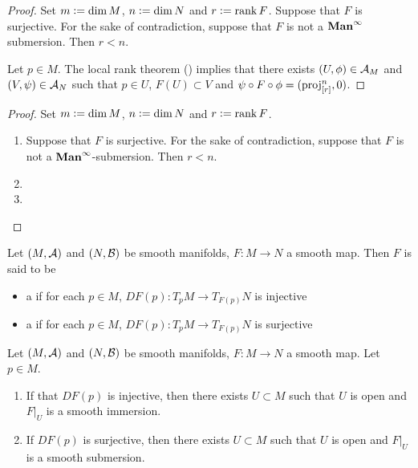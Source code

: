 \documentclass{book}
\begin{document}
	\begin{proof}
		Set $m \vcentcolon= \dim M$, $n \vcentcolon= \dim N$ and $r \vcentcolon= \operatorname{\text{rank}} F$. Suppose that $F$ is surjective. For the sake of contradiction, suppose that $F$ is not a $\operatorname*{\text{\textbf{Man}}^{\infty}}$ submersion. Then $r < n$. 
		
		
		Let $p \in M$. The local rank theorem () implies that there exists $(U, \phi) \in \mathcal{A}_M$ and $(V, \psi) \in \mathcal{A}_N$ such that $p \in U$, $F(U) \subset V$ and $\psi \circ F \circ \phi = (\operatorname{\text{proj}}^n_{[r]}, 0)$. 
		
		
	\end{proof}

	\begin{proof}
		Set $m \vcentcolon= \dim M$, $n \vcentcolon= \dim N$ and $r \vcentcolon= \operatorname{\text{rank}} F$. 
		\begin{enumerate}
			\item Suppose that $F$ is surjective. For the sake of contradiction, suppose that $F$ is not a $\operatorname*{\text{\textbf{Man}}^{\infty}}$-submersion. Then $r < n$. 
			\item 
			\item 
		\end{enumerate}
	\end{proof}
	
	
	\begin{defn} 
		Let $(M, \mathcal{A})$ and $(N, \mathcal{B})$ be smooth manifolds, $F: M \rightarrow N$ a smooth map. Then $F$ is said to be 
		\begin{itemize}
		
			\item a  if for each $p \in M$, $DF(p):T_pM\rightarrow T_{F(p)}N$ is injective
			\item a  if for each $p \in M$, $DF(p) :T_pM\rightarrow T_{F(p)}N$ is surjective
		\end{itemize}
	\end{defn}

	\begin{ex} 
	Let $(M, \mathcal{A})$ and $(N, \mathcal{B})$ be smooth manifolds, $F: M \rightarrow N$ a smooth map. Let $p \in M$.
	\begin{enumerate}
		\item If that $DF(p)$ is injective, then there exists $U \subset M$ such that $U$ is open and $F|_U$ is a smooth immersion.
		\item If $DF(p)$ is surjective, then there exists $U \subset M$ such that $U$ is open and $F|_U$ is a smooth submersion.
	\end{enumerate}
	\end{ex}
\end{document}
